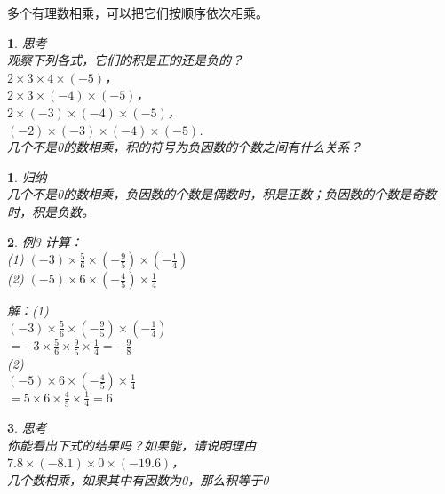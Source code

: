 \documentclass[11pt]{article}
\newtheorem{exercise}{ }
\newtheorem{article}{ }
\begin{document}
多个有理数相乘，可以把它们按顺序依次相乘。

\begin{exercise}
思考\\
观察下列各式，它们的积是正的还是负的？\\
$2 \times 3 \times 4 \times (-5)$，\\
$2 \times 3 \times (-4) \times (-5)$，\\
$2 \times( -3) \times (-4) \times (-5)$，\\
$(-2) \times (-3) \times (-4) \times (-5)$.\\
几个不是0的数相乘，积的符号为负因数的个数之间有什么关系？\\
\end{exercise}
\begin{article}
归纳\\
	几个不是0的数相乘，负因数的个数是偶数时，积是正数；负因数的个数是奇数时，积是负数。\\
\end{article}
\begin{exercise}
例3 计算：\\
(1)
$ (-3) \times \frac{5}{6} \times (-\frac{9}{5}) \times (-\frac{1}{4}) $\\
(2)
$ (-5) \times 6 \times (-\frac{4}{5}) \times \frac{1}{4} $

解：(1)\\
$ (-3) \times \frac{5}{6} \times (-\frac{9}{5}) \times (-\frac{1}{4}) $\\
$ = -3 \times \frac{5}{6} \times \frac{9}{5} \times \frac{1}{4} = -\frac{9}{8} $\\
(2)\\
$ (-5) \times 6 \times (-\frac{4}{5}) \times \frac{1}{4} $\\
$ = 5 \times 6 \times \frac{4}{5} \times \frac{1}{4} = 6 $\\
\end{exercise}

\begin{exercise}
思考\\
你能看出下式的结果吗？如果能，请说明理由.\\
$7.8 \times (-8.1) \times 0 \times (-19.6)$，\\

几个数相乘，如果其中有因数为0，那么积等于0\\
\end{exercise}
\end{document}
